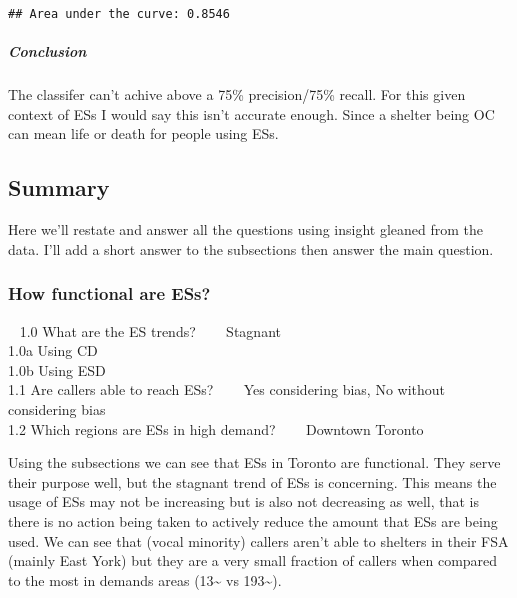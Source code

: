 \documentclass[
]{article}
\begin{document}
\begin{verbatim}
## Area under the curve: 0.8546
\end{verbatim}

\hypertarget{conclusion-6}{%
\subparagraph{Conclusion}\label{conclusion-6}}

The classifer can't achive above a 75\% precision/75\% recall. For this
given context of ESs I would say this isn't accurate enough. Since a
shelter being OC can mean life or death for people using ESs.

\hypertarget{summary}{%
\subsection{Summary}\label{summary}}

Here we'll restate and answer all the questions using insight gleaned
from the data. I'll add a short answer to the subsections then answer
the main question.

\hypertarget{how-functional-are-ess-1}{%
\subsubsection{How functional are ESs?}\label{how-functional-are-ess-1}}

~ 1.0 What are the ES trends? ~~~ Stagnant\\
\hspace*{0.333em}\hspace*{0.333em} 1.0a Using CD\\
\hspace*{0.333em}\hspace*{0.333em} 1.0b Using ESD\\
\hspace*{0.333em} 1.1 Are callers able to reach ESs? ~~~ Yes considering
bias, No without considering bias\\
\hspace*{0.333em} 1.2 Which regions are ESs in high demand? ~~~ Downtown
Toronto

Using the subsections we can see that ESs in Toronto are functional.
They serve their purpose well, but the stagnant trend of ESs is
concerning. This means the usage of ESs may not be increasing but is
also not decreasing as well, that is there is no action being taken to
actively reduce the amount that ESs are being used. We can see that
(vocal minority) callers aren't able to shelters in their FSA (mainly
East York) but they are a very small fraction of callers when compared
to the most in demands areas (13\textasciitilde{} vs
193\textasciitilde).
\end{document}
